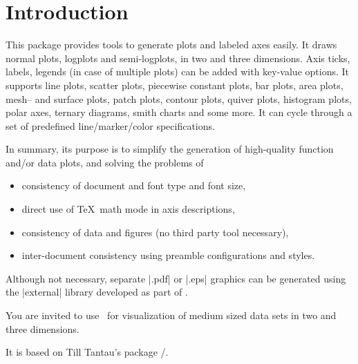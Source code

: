 \chapter{Introduction}
This package provides tools to generate plots and labeled axes easily. It draws normal plots, logplots and semi-logplots, in two and three dimensions. Axis ticks, labels, legends (in case of multiple plots) can be added with key-value options. It supports line plots, scatter plots, piecewise constant plots, bar plots, area plots, mesh-- and surface plots, patch plots, contour plots, quiver plots, histogram plots, polar axes, ternary diagrams, smith charts and some more. 
It can cycle through a set of predefined line/marker/color specifications. 

In summary, its purpose is to simplify the generation of high-quality function and/or data plots, and solving the problems of
\begin{itemize}
	\item consistency of document and font type and font size,
	\item direct use of \TeX\ math mode in axis descriptions,
	\item consistency of data and figures (no third party tool necessary),
	\item inter-document consistency using preamble configurations and styles.
\end{itemize}
Although not necessary, separate |.pdf| or |.eps| graphics can be generated using the |external| library developed as part of \Tikz.

You are invited to use \PGFPlots\ for visualization of medium sized data sets in two and three dimensions.

It is based on Till Tantau's package \PGF/\Tikz.
